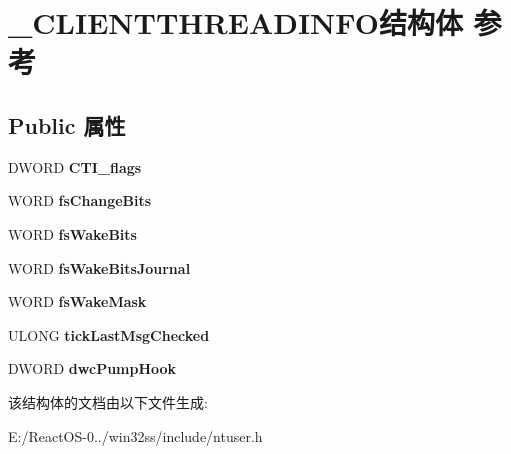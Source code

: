 \hypertarget{struct___c_l_i_e_n_t_t_h_r_e_a_d_i_n_f_o}{}\section{\+\_\+\+C\+L\+I\+E\+N\+T\+T\+H\+R\+E\+A\+D\+I\+N\+F\+O结构体 参考}
\label{struct___c_l_i_e_n_t_t_h_r_e_a_d_i_n_f_o}
\subsection*{Public 属性}
\begin{DoxyCompactItemize}
\item 
\mbox{\label{struct___c_l_i_e_n_t_t_h_r_e_a_d_i_n_f_o_ac45c4fa33af36b872002ea108e13bae5}} 
D\+W\+O\+RD {\bfseries C\+T\+I\+\_\+flags}
\item 
\mbox{\label{struct___c_l_i_e_n_t_t_h_r_e_a_d_i_n_f_o_ad09e788eac461d82c1f453b4fbf079b5}} 
W\+O\+RD {\bfseries fs\+Change\+Bits}
\item 
\mbox{\label{struct___c_l_i_e_n_t_t_h_r_e_a_d_i_n_f_o_a578d80ee36e62da2a06973926cab091b}} 
W\+O\+RD {\bfseries fs\+Wake\+Bits}
\item 
\mbox{\label{struct___c_l_i_e_n_t_t_h_r_e_a_d_i_n_f_o_a8e7b20450db5be4e09e05dc0ba8ed8ba}} 
W\+O\+RD {\bfseries fs\+Wake\+Bits\+Journal}
\item 
\mbox{\label{struct___c_l_i_e_n_t_t_h_r_e_a_d_i_n_f_o_a05d766182961781d4a007d534dfa9b65}} 
W\+O\+RD {\bfseries fs\+Wake\+Mask}
\item 
\mbox{\label{struct___c_l_i_e_n_t_t_h_r_e_a_d_i_n_f_o_a9af98ba56d180fe4d9295a8e380ddca1}} 
U\+L\+O\+NG {\bfseries tick\+Last\+Msg\+Checked}
\item 
\mbox{\label{struct___c_l_i_e_n_t_t_h_r_e_a_d_i_n_f_o_ab07b409c5ca46d723605482a44324a8d}} 
D\+W\+O\+RD {\bfseries dwc\+Pump\+Hook}
\end{DoxyCompactItemize}


该结构体的文档由以下文件生成\+:\begin{DoxyCompactItemize}
\item 
E\+:/\+React\+O\+S-\/0../win32ss/include/ntuser.\+h\end{DoxyCompactItemize}
